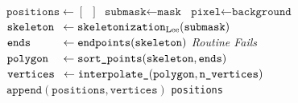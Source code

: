\documentclass[10pt,letterpaper]{article}
\begin{document}

\begin{algorithm}
    \caption{Position Extraction Algorithm}
    \label{algo:extraction-algorithm}
    \begin{algorithmic}[1]
        \State $\texttt{positions} \gets [\hspace{6pt}]$
            \State $\texttt{submask} \gets \texttt{mask}$%
                    \State $\texttt{pixel}\gets\texttt{background}$
                \EndIf
            \EndFor
            \State $\mathrlap{\texttt{skeleton}}\hphantom{\texttt{verticess}} \gets \texttt{skeletonization}_\text{Lee}(\texttt{submask})$
            \State $\mathrlap{\texttt{ends}}\hphantom{\texttt{verticess}} \gets \texttt{endpoints}(\texttt{skeleton})$
                \State \textit{Routine Fails}
            \EndIf
            \State $\mathrlap{\texttt{polygon}}\hphantom{\texttt{verticess}} \gets \texttt{sort\_points}(\texttt{skeleton},\texttt{ends})$
            \State $\mathrlap{\texttt{vertices}}\hphantom{\texttt{verticess}} \gets \texttt{interpolate\_}(\texttt{polygon}, \texttt{n\_vertices})$
            \State $\texttt{append}(\texttt{positions}, \texttt{vertices})$
        \EndFor
        \State \Return \texttt{positions}
        \EndFunction
    \end{algorithmic}
\end{algorithm}
\end{document}
